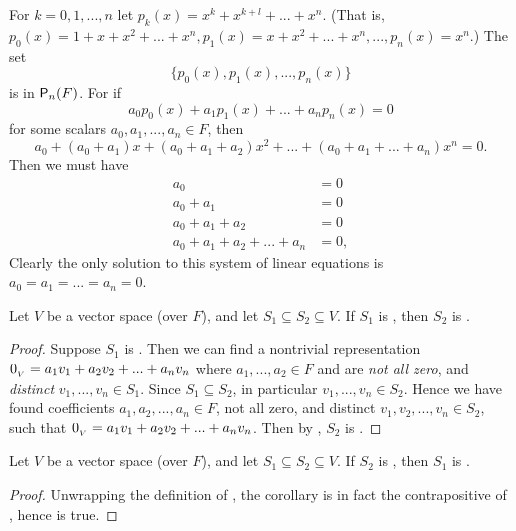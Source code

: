 \begin{example} \label{example 1.5.4}
For \(k = 0, 1, ..., n\) let \(p_k(x) = x^k + x^{k+l} + ... + x^n\).
(That is, \(p_0(x) = 1 + x + x^2 + ... + x^n, p_1(x) = x + x^2 + ... + x^n, ..., p_n(x) = x^n\).)
The set
\[
    \{ p_0(x), p_1(x), ..., p_n(x) \}
\]
is \LID{} in \(\textsf{P}_n(F)\).
For if
\[
    a_0 p_0(x) + a_1 p_1(x) + ... + a_n p_n(x) = 0
\]
for some scalars \(a_0, a_1, ..., a_n \in F\), then
\[
    a_0 + (a_0 + a_1)x + (a_0 + a_1 + a_2)x^2 + ... + (a_0 + a_1 + ... + a_n)x^n = 0.
\]
Then we must have
\begin{align*}
                            a_0 & = 0 \\
                      a_0 + a_1 & = 0 \\
                a_0 + a_1 + a_2 & = 0 \\
    a_0 + a_1 + a_2 + ... + a_n & = 0,
\end{align*}
Clearly the only solution to this system of linear equations is \(a_0 = a_1 = ... = a_n = 0\).
\end{example}

\begin{theorem} \label{thm 1.6}
Let \(V\) be a vector space (over \(F\)), and let \(S_1 \subseteq S_2 \subseteq V\).
If \(S_1\) is \LDP{}, then \(S_2\) is \LDP{}.
\end{theorem}

\begin{proof}
Suppose \(S_1\) is \LDP{}.
Then we can find a nontrivial representation \(0_{_V} = a_1 v_1 + a_2 v_2 + ... + a_n v_n\) where \(a_1, ..., a_2 \in F\) and are \emph{not all zero}, and \emph{distinct} \(v_1, ..., v_n \in S_1\).
Since \(S_1 \subseteq S_2\), in particular \(v_1, ..., v_n \in S_2\).
Hence we have found coefficients \(a_1, a_2, ..., a_n \in F\), not all zero, and distinct \(v_1, v_2, ..., v_n \in S_2\), such that \(0_{_V} = a_1 v_1 + a_2 v_2 + ... + a_n v_n\).
Then by , \(S_2\) is \LDP{}.
\end{proof}

\begin{corollary} \label{corollary 1.6.1}
Let \(V\) be a vector space (over \(F\)), and let \(S_1 \subseteq S_2 \subseteq V\).
If \(S_2\) is \LID{}, then \(S_1\) is \LID{}.
\end{corollary}

\begin{proof}
Unwrapping the definition of \LID{}, the corollary is in fact the contrapositive of , hence is true.
\end{proof}

